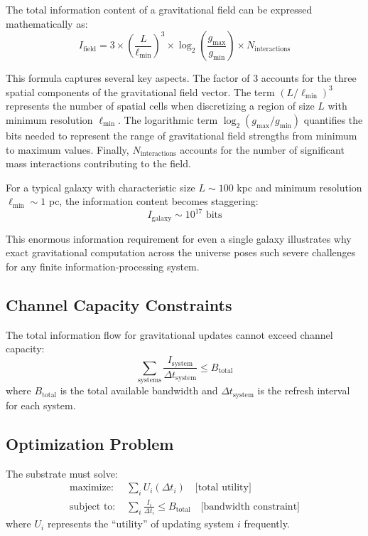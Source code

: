 \documentclass[twocolumn,prd,amsmath,amssymb,aps,superscriptaddress,nofootinbib]{revtex4-2}
\begin{document}
The total information content of a gravitational field can be expressed mathematically as:
\begin{equation}
I_{\text{field}} = 3 \times \left(\frac{L}{\ell_{\text{min}}}\right)^3 \times \log_2\left(\frac{g_{\text{max}}}{g_{\text{min}}}\right) \times N_{\text{interactions}}
\end{equation}

This formula captures several key aspects. The factor of 3 accounts for the three spatial components of the gravitational field vector. The term $(L/\ell_{\text{min}})^3$ represents the number of spatial cells when discretizing a region of size $L$ with minimum resolution $\ell_{\text{min}}$. The logarithmic term $\log_2(g_{\text{max}}/g_{\text{min}})$ quantifies the bits needed to represent the range of gravitational field strengths from minimum to maximum values. Finally, $N_{\text{interactions}}$ accounts for the number of significant mass interactions contributing to the field.

For a typical galaxy with characteristic size $L \sim 100$ kpc and minimum resolution $\ell_{\text{min}} \sim 1$ pc, the information content becomes staggering:
\begin{equation}
I_{\text{galaxy}} \sim 10^{17} \text{ bits}
\end{equation}

This enormous information requirement for even a single galaxy illustrates why exact gravitational computation across the universe poses such severe challenges for any finite information-processing system.

\subsection{Channel Capacity Constraints}

The total information flow for gravitational updates cannot exceed channel capacity:
\begin{equation}
\sum_{\text{systems}} \frac{I_{\text{system}}}{\Delta t_{\text{system}}} \leq B_{\text{total}}
\end{equation}
where $B_{\text{total}}$ is the total available bandwidth and $\Delta t_{\text{system}}$ is the refresh interval for each system.

\subsection{Optimization Problem}

The substrate must solve:
\begin{align}
\text{maximize: } & \sum_i U_i(\Delta t_i) \quad \text{[total utility]} \\
\text{subject to: } & \sum_i \frac{I_i}{\Delta t_i} \leq B_{\text{total}} \quad \text{[bandwidth constraint]}
\end{align}
where $U_i$ represents the ``utility'' of updating system $i$ frequently.
\end{document}
